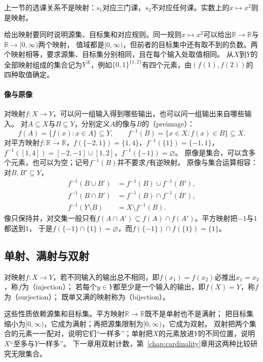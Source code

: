 上一节的选课关系不是映射：$s_1$对应三门课，$s_3$不对应任何课。实数上的$x\mapsto x^2$则是映射。

给出映射要同时说明源集、目标集和对应规则。同一规则$x\mapsto x^2$可以给出$\mathbb R\to\mathbb R$与$\mathbb R\to[0,\infty)$两个映射，
值域都是$[0,\infty)$，但前者的目标集中还有取不到的负数。两个映射相等，要求源集、目标集分别相同，且在每个输入处取值相同。
从$X$到$Y$的全部映射组成的集合记为$Y^X$，例如$\{0,1\}^{\{1,2\}}$有四个元素，由$(f(1),f(2))$的四种取值确定。

\paragraph{像与原像}
对映射$f:X\to Y$，可以问一组输入得到哪些输出，也可以问一组输出来自哪些输入。
对$A\subseteq X$与$B\subseteq Y$，分别定义$A$的像与$B$的（preimage）：
\begin{equation}
 f(A)=\{f(x):x\in A\}\subseteq Y,\qquad
 f^{-1}(B)=\{x\in X:f(x)\in B\}\subseteq X.
 \label{eq:prelim-preimage}
\end{equation}
对平方映射$f:\mathbb R\to\mathbb R$，$f(\{-2,1\})=\{1,4\}$，$f^{-1}(\{1\})=\{-1,1\}$，$f^{-1}([1,4])=[-2,-1]\cup[1,2]$，$f^{-1}(\{-1\})=\varnothing$。
原像是集合，可以含多个元素，也可以为空；记号$f^{-1}(B)$并不要求$f$有逆映射。
原像与集合运算相容：对$B,B'\subseteq Y$，
\begin{align*}
 f^{-1}(B\cup B')&=f^{-1}(B)\cup f^{-1}(B'),\\
 f^{-1}(B\cap B')&=f^{-1}(B)\cap f^{-1}(B'),\\
 f^{-1}(Y\setminus B)&=X\setminus f^{-1}(B).
\end{align*}
像只保持并，对交集一般只有$f(A\cap A')\subseteq f(A)\cap f(A')$。平方映射把$-1$与$1$都送到$1$，
于是$f(\{-1\}\cap\{1\})=\varnothing$，而$f(\{-1\})\cap f(\{1\})=\{1\}$。

\subsection{单射、满射与双射}
\label{sec:prelim-function-types}

对映射$f:X\to Y$，若不同输入的输出总不相同，即$f(x_1)=f(x_2)$必推出$x_1=x_2$，称$f$为（injection）；
若每个$y\in Y$都至少是一个输入的输出，即$f(X)=Y$，称$f$为（surjection）；
既单又满的映射称为（bijection）。

这些性质依赖源集和目标集。平方映射$\mathbb R\to\mathbb R$既不是单射也不是满射；
把目标集缩小为$[0,\infty)$，它成为满射；再把源集限制为$[0,\infty)$，它成为双射。
双射把两个集合的元素一一配对，说明它们“一样多”；单射把$X$的元素放进$Y$的不同位置，说明$X$“至多与$Y$一样多”。
下一章用双射计数，第~\ref{chap:cardinality}章用这两种比较研究无限集合。

